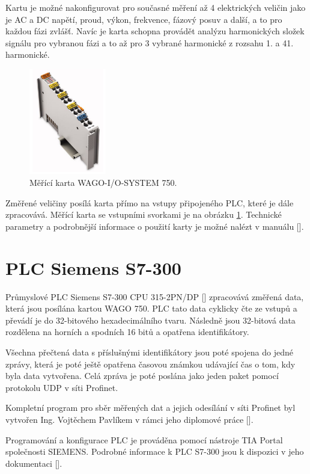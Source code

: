 Kartu je možné nakonfigurovat pro současné měření až 4 elektrických veličin jako je AC a DC napětí, proud, výkon, frekvence, fázový posuv a další, a to pro každou fázi zvlášť. Navíc je karta schopna provádět analýzu harmonických složek signálu pro vybranou fázi a to až pro 3 vybrané harmonické z rozsahu 1. a 41. harmonické. 

\begin{figure}[ht]
    \includegraphics[width=0.3\textwidth]{wago_obr}
    \caption{Měřící karta WAGO-I/O-SYSTEM 750.}
    \label{wago_pic}
\end{figure}

Změřené veličiny posílá karta přímo na vstupy připojeného PLC, které je dále zpracovává. Měřící karta se vstupními svorkami je na obrázku \ref{wago_pic}. Technické parametry a podrobnější informace o použití karty je možné nalézt v manuálu [\cite{wago}].

\section{PLC Siemens S7-300}

Průmyslové PLC Siemens S7-300 CPU 315-2PN/DP [\cite{siemens_plc}] zpracovává změřená data, která jsou posílána kartou WAGO 750. PLC tato data cyklicky čte ze vstupů a převádí je do 32-bitového hexadecimálního tvaru. Následně jsou 32-bitová data rozdělena na horních a spodních 16 bitů a opatřena identifikátory. 

Všechna přečtená data s příslušnými identifikátory jsou poté spojena do jedné zprávy, která je poté ještě opatřena časovou známkou udávající čas o tom, kdy byla data vytvořena. Celá zpráva je poté poslána jako jeden paket pomocí protokolu UDP v síti Profinet.  

Kompletní program pro sběr měřených dat a jejich odesílání v síti Profinet byl vytvořen Ing. Vojtěchem Pavlíkem v rámci jeho diplomové práce [\cite{vojtech_pavlik}]. 

Programování a konfigurace PLC je prováděna pomocí nástroje TIA Portal společnosti SIEMENS. Podrobné informace k PLC S7-300 jsou k dispozici v jeho dokumentaci [\cite{siemens_plc}].  

